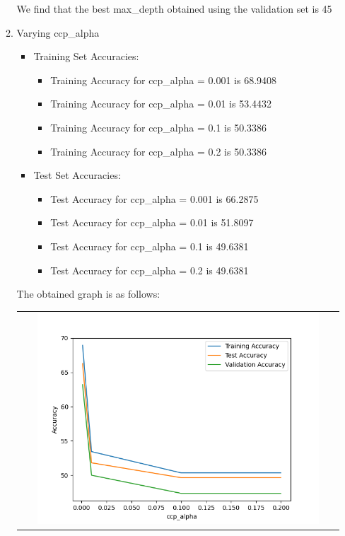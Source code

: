 \begin{enumerate}[label=(\alph*)]
\begin{enumerate}[label=\roman*.]
\begin{center}
\begin{tabular}{c}
        \end{tabular}
    \end{center}
    We find that the best max\_depth obtained using the validation set is 45
    \item Varying ccp\_alpha
    \begin{itemize}
        \item Training Set Accuracies:
        \begin{itemize}
            \item Training Accuracy for ccp\_alpha = 0.001 is 68.9408
            \item Training Accuracy for ccp\_alpha = 0.01 is 53.4432
            \item Training Accuracy for ccp\_alpha = 0.1 is 50.3386
            \item Training Accuracy for ccp\_alpha = 0.2 is 50.3386
        \end{itemize}
        \item Test Set Accuracies:
        \begin{itemize}
            \item Test Accuracy for ccp\_alpha = 0.001 is 66.2875
            \item Test Accuracy for ccp\_alpha = 0.01 is 51.8097
            \item Test Accuracy for ccp\_alpha = 0.1 is 49.6381
            \item Test Accuracy for ccp\_alpha = 0.2 is 49.6381
        \end{itemize}
    \end{itemize}
    \newpage
    The obtained graph is as follows:
    \begin{center}
        \begin{tabular}{c}
            \includegraphics[width=0.9\textwidth]{../Q1/Graphs/d_ccp_alpha.png}

\end{tabular}
\end{center}
\end{enumerate}
\end{enumerate}
